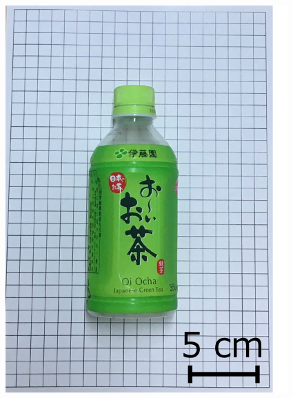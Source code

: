 \begin{figure}[H]
    \centering
    
    \begin{minipage}{0.19\columnwidth}
        \centering
        \includegraphics[clip, width=\linewidth]{figure/chapter4/bottle_350ml}
    \end{minipage}
    \begin{minipage}{0.19\columnwidth}
        \centering

\end{minipage}
\end{figure}

